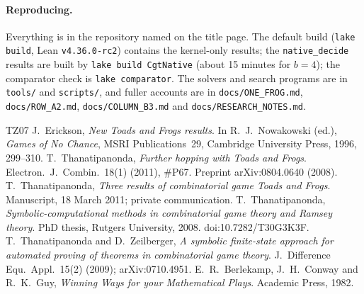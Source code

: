 \documentclass[11pt,a4paper]{article}
\newcommand{\lean}[1]{\texttt{#1}}
\theoremstyle{plain}
\theoremstyle{remark}
\begin{document}
\paragraph{Reproducing.} Everything is in the repository named on the title page. The default
build (\texttt{lake build}, Lean \texttt{v4.36.0-rc2}) contains the kernel-only results; the
\lean{native\_decide} results are built by \texttt{lake build CgtNative} (about 15 minutes for
$b=4$); the comparator check is \texttt{lake comparator}. The solvers and search programs are in
\texttt{tools/} and \texttt{scripts/}, and fuller accounts are in \texttt{docs/ONE\_FROG.md},
\texttt{docs/ROW\_A2.md},
\texttt{docs/COLUMN\_B3.md} and \texttt{docs/RESEARCH\_NOTES.md}.

\begin{thebibliography}{TZ07}
 J.~Erickson, \emph{New Toads and Frogs results}. In R.~J.~Nowakowski (ed.),
  \emph{Games of No Chance}, MSRI Publications~29, Cambridge University Press, 1996, 299--310.
 T.~Thanatipanonda, \emph{Further hopping with Toads and Frogs}. Electron.\ J.\
  Combin.\ 18(1) (2011), \#P67. Preprint arXiv:0804.0640 (2008).
\bibitem[T11b]{T11b} T.~Thanatipanonda, \emph{Three results of combinatorial game Toads and
  Frogs}. Manuscript, 18 March 2011; private communication.
 T.~Thanatipanonda, \emph{Symbolic-computational methods in combinatorial game
  theory and Ramsey theory}. PhD thesis, Rutgers University, 2008. doi:10.7282/T30G3K3F.
\bibitem[TZ07]{TZ07} T.~Thanatipanonda and D.~Zeilberger, \emph{A symbolic finite-state approach
  for automated proving of theorems in combinatorial game theory}. J.\ Difference Equ.\ Appl.\
  15(2) (2009); arXiv:0710.4951.
\bibitem[WW]{WW} E.~R.~Berlekamp, J.~H.~Conway and R.~K.~Guy, \emph{Winning Ways for your
  Mathematical Plays}. Academic Press, 1982.
\end{thebibliography}
\end{document}
